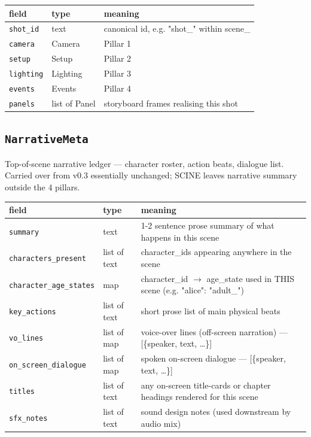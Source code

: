 \begin{longtable}{@{}R{0.24\textwidth}R{0.21\textwidth}R{0.49\textwidth}@{}}
\toprule \textbf{field} & \textbf{type} & \textbf{meaning} \\ \midrule
\endhead
\texttt{shot\_\allowbreak id} & text & canonical id, e.g. "shot\_" within scene\_ \\
\texttt{camera} & Camera & Pillar 1 \\
\texttt{setup} & Setup & Pillar 2 \\
\texttt{lighting} & Lighting & Pillar 3 \\
\texttt{events} & Events & Pillar 4 \\
\texttt{panels} & list of Panel & storyboard frames realising this shot \\
\bottomrule
\end{longtable}

\subsection*{\texttt{NarrativeMeta}}
\noindent Top-of-scene narrative ledger ---\allowbreak{} character roster, action beats, dialogue list. Carried over from v0.3 essentially unchanged; SCINE leaves narrative summary outside the 4 pillars.

\begin{longtable}{@{}R{0.24\textwidth}R{0.21\textwidth}R{0.49\textwidth}@{}}
\toprule \textbf{field} & \textbf{type} & \textbf{meaning} \\ \midrule
\endhead
\texttt{summary} & text & 1-2 sentence prose summary of what happens in this scene \\
\texttt{characters\_\allowbreak present} & list of text & character\_\allowbreak ids appearing anywhere in the scene \\
\texttt{character\_\allowbreak age\_\allowbreak states} & map & character\_\allowbreak id $\to$ age\_\allowbreak state used in THIS scene (e.g. "alice": "adult\_") \\
\texttt{key\_\allowbreak actions} & list of text & short prose list of main physical beats \\
\texttt{vo\_\allowbreak lines} & list of map & voice-over lines (off-screen narration) ---\allowbreak{} [\{speaker, text, \ldots{}\}] \\
\texttt{on\_\allowbreak screen\_\allowbreak dialogue} & list of map & spoken on-screen dialogue ---\allowbreak{} [\{speaker, text, \ldots{}\}] \\
\texttt{titles} & list of text & any on-screen title-cards or chapter headings rendered for this scene \\
\texttt{sfx\_\allowbreak notes} & list of text & sound design notes (used downstream by audio mix) \\
\bottomrule
\end{longtable}

